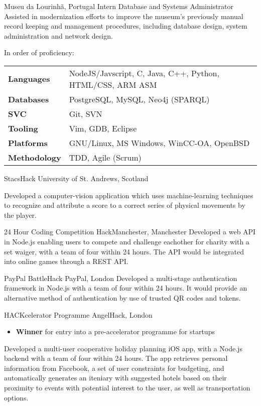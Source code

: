 \documentclass[12pt,a4paper]{article}
\begin{document}
       {Museu da Lourinh\~a, Portugal}
       {Intern Database and Systems Administrator}
{%
  Assisted in modernization efforts to improve the museum's previously manual
  record keeping and management procedures, including database design, system
  administration and network design.
}

\pagebreak

In order of proficiency:\\

\begin{tabular}{>{\bfseries}l l}
  Languages   & NodeJS/Javscript, C, Java, C++, Python, HTML/CSS, ARM ASM\\
  Databases   & PostgreSQL, MySQL, Neo4j (SPARQL)\\
  SVC         & Git, SVN\\
  Tooling     & Vim, GDB, Eclipse\\
  Platforms   & GNU/Linux, MS Windows, WinCC-OA, OpenBSD\\
  Methodology & TDD, Agile (Scrum)
\end{tabular}


       {StacsHack}
       {University of St. Andrews, Scotland}
{%

  Developed a computer-vision application which uses machine-learning techniques
  to recognize and attribute a score to a correct series of physical movements
  by the player.

}

       {24 Hour Coding Competition}
       {HackManchester, Manchester}
{%
  Developed a web API in Node.js enabling users to compete and challenge
  eachother for charity with a set waiger, with a team of four within 24 hours.
  The API would be integrated into online games through a REST API\@.
}

       {PayPal BattleHack}
       {PayPal, London}
{%
  Developed a multi-stage authentication framework in Node.js with a team of
  four within 24 hours. It would provide an alternative method of authentication
  by use of trusted QR codes and tokens.
}

       {HACKcelerator Programme}
       {AngelHack, London}
{%
  \begin{itemize}
    \item{\bfseries Winner} for entry into a pre-accelerator
      programme for startups
  \end{itemize}

  Developed a multi-user cooperative holiday planning iOS app, with a Node.js
  backend with a team of four within 24 hours. The app retrieves personal
  information from Facebook, a set of user constraints for budgeting, and
  automatically generates an iteniary with suggested hotels based on their
  proximity to events with potential interest to the user, as well as
  transportation options.
}
\end{document}
